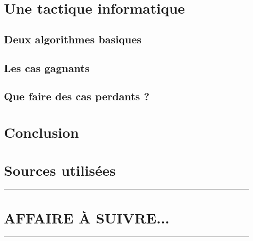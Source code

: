 \documentclass[12pt]{amsart}
\newcommand\contentdir{\jobname}
\begin{document}





\section{Une tactique informatique}

\subsection{Deux algorithmes basiques} \label{algos-used}






\subsection{Les cas gagnants} \label{algo-OK}




\subsection{Que faire des cas perdants ?} \label{algo-KO}









\newpage
\section{Conclusion}






\bigskip
\section{Sources utilisées} \label{sources}






\newpage

\hrule

\section{AFFAIRE À SUIVRE...}

\bigskip

\hrule
\end{document}
